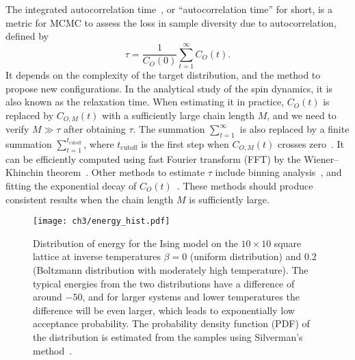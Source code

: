 The integrated autocorrelation time~\cite{ambegaokar2010estimating, goodman2010ensemble}, or ``autocorrelation time'' for short, is a metric for MCMC to assess the loss in sample diversity due to autocorrelation, defined by
\begin{equation}
\tau = \frac{1}{C_O(0)} \sum_{t = 1}^\infty C_O(t).
\label{eq:iat}
\end{equation}
It depends on the complexity of the target distribution, and the method to propose new configurations. In the analytical study of the spin dynamics, it is also known as the relaxation time. When estimating it in practice, $C_O(t)$ is replaced by $C_{O, M}(t)$ with a sufficiently large chain length $M$, and we need to verify $M \gg \tau$ after obtaining $\tau$. The summation $\sum_{t = 1}^\infty$ is also replaced by a finite summation $\sum_{t = 1}^{t_\text{cutoff}}$, where $t_\text{cutoff}$ is the first step when $C_{O, M}(t)$ crosses zero~\cite{wu2021unbiased}. It can be efficiently computed using fast Fourier transform (FFT) by the Wiener--Khinchin theorem~\cite{wiener1930generalized}. Other methods to estimate $\tau$ include binning analysis~\cite{wallerberger2018efficient}, and fitting the exponential decay of $C_O(t)$~\cite{bialas2023analysis}. These methods should produce consistent results when the chain length $M$ is sufficiently large.

\begin{figure}[htb]
\centering
\texttt{[image: ch3/energy\_hist.pdf]}
\caption[Distribution of energy for Ising model at different temperatures]{
Distribution of energy for the Ising model on the $10 \times 10$ square lattice at inverse temperatures $\beta = 0$ (uniform distribution) and $0.2$ (Boltzmann distribution with moderately high temperature).
The typical energies from the two distributions have a difference of around $-50$, and for larger systems and lower temperatures the difference will be even larger, which leads to exponentially low acceptance probability.
The probability density function (PDF) of the distribution is estimated from the samples using Silverman’s method~\cite{silverman1986density}.
}
\label{fig:energy-hist}
\end{figure}

